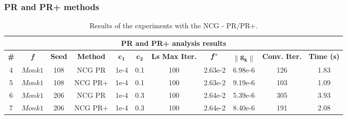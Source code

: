\documentclass[11pt]{article}
\newcommand{\norm}[1]{\left\lVert#1\right\rVert}
\newcommand{\cgv}[1]{{\textcolor{RedOrange}[\textcolor{RedOrange}{\bf{GV: }}{ \textcolor{RedOrange}
              {#1}\textcolor{RedOrange}]}}}
\begin{document}



\subsubsection{PR and PR+ methods}
\begin{table}[H]
\small
    \centering
    \begin{tabular}{ |c|c|c|c|c|c|c|c|c|c|c|}
    \hline
     \multicolumn{11}{|c|}{\textbf{PR and PR+ analysis results}} \\
      \hline
       \textbf{\#} & \textbf{\textit{f}} & \textbf{Seed} & \textbf{Method} & $\mathbf{c_1}$ & $\mathbf{c_2}$ & \textbf{Ls Max Iter.} & $\mathbf{\textit{\textbf{f}}\,^*}$ & $\mathbf{\norm{\mathbf{g}_k}}$ & \textbf{Conv. Iter.} & \textbf{Time (s)}\\
     \hline
      4 & $Monk1$ & 108 & NCG PR & 1e-4 & 0.1 & 100 & 2.63e-2 & 6.98e-6 & 126 & 1.83\\
      \hline
      5 & $Monk1$ & 108 & NCG PR+ & 1e-4 & 0.1 & 100 & 2.63e-2 & 9.19e-6 & 103 & 1.09\\
      \hline
      6 & $Monk1$ & 206 & NCG PR & 1e-4 & 0.3 & 100 & 2.64e-2 & 5.39e-6 & 305 & 3.93\\
      \hline
      7 & $Monk1$ & 206 & NCG PR+ & 1e-4 & 0.3 & 100 & 2.64e-2 & 8.40e-6 & 191 & 2.08\\
      \hline
    \end{tabular}
    \caption{Results of the experiments with the NCG - PR/PR+.}
    \label{tab:pr_behavior}
\end{table}
\end{document}
